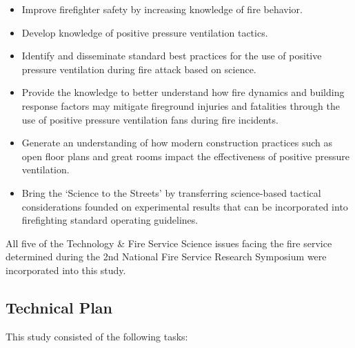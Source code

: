 \documentclass{article}
\begin{document}
\begin{itemize}
	\item Improve firefighter safety by increasing knowledge of fire behavior.
	\item Develop knowledge of positive pressure ventilation tactics.
	\item Identify and disseminate standard best practices for the use of positive pressure ventilation during fire attack based on science.
	\item Provide the knowledge to better understand how fire dynamics and building response factors may mitigate fireground injuries and fatalities through the use of positive pressure ventilation fans during fire incidents.
	\item Generate an understanding of how modern construction practices such as open floor plans and great rooms impact the effectiveness of positive pressure ventilation.
	\item Bring the `Science to the Streets' by transferring science-based tactical considerations founded on experimental results that can be incorporated into firefighting standard operating guidelines.
\end{itemize}

All five of the Technology \& Fire Service Science issues facing the fire service determined during the 2nd National Fire Service Research Symposium \cite{NFFF} were incorporated into this study.

\subsection{Technical Plan}

This study consisted of the following tasks:
\end{document}
